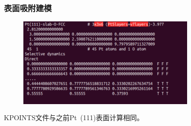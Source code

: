 {
	\frametitle{表面吸附建模}
\begin{figure}[h!]
\vskip -5pt
\centering
\includegraphics[width=3.5in,viewport=0 10 520 280,clip]{Figures/Pt_surface-adsorption-POSCAR.png}
\caption{\fontsize{6.2pt}{5.2pt}}%
\label{Pt_surface-adsorption-POSCAR}
\end{figure}
{\fontsize{7.0pt}{5.2pt}}

\textrm{KPOINTS}文件与之前\textrm{Pt~(111)}表面计算相同。
}

